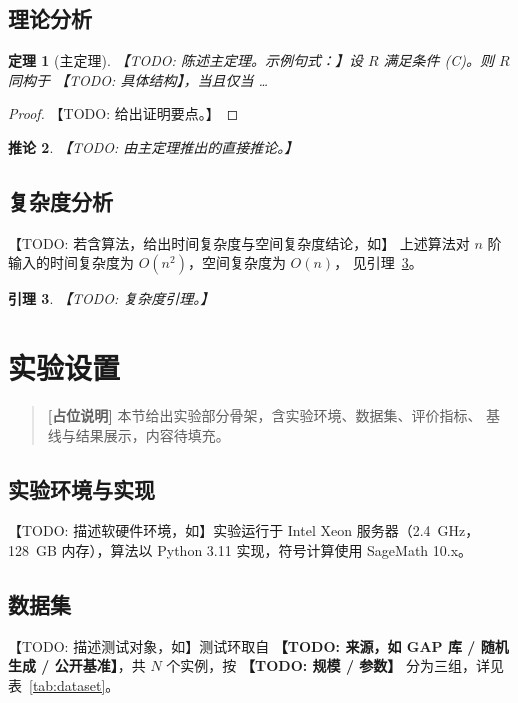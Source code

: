 \documentclass[11pt]{ctexart}
\theoremstyle{plain}
\newtheorem{theorem}{定理}[section]
\newtheorem{lemma}[theorem]{引理}
\newtheorem{corollary}[theorem]{推论}
\theoremstyle{definition}
\theoremstyle{remark}
\begin{document}
\subsection{理论分析}
\label{sec:method-analysis}
\begin{theorem}[主定理]
\label{thm:main}
【TODO: 陈述主定理。示例句式：】设 $R$ 满足条件 (C)。则 $R$ 同构于
【TODO: 具体结构】，当且仅当 \dots
\end{theorem}

\begin{proof}
【TODO: 给出证明要点。】
\end{proof}

\begin{corollary}
\label{cor:main}
【TODO: 由主定理推出的直接推论。】
\end{corollary}

\subsection{复杂度分析}
\label{sec:method-complexity}
【TODO: 若含算法，给出时间复杂度与空间复杂度结论，如】
上述算法对 $n$ 阶输入的时间复杂度为 $O(n^2)$，空间复杂度为 $O(n)$，
见引理~\ref{lem:complexity}。

\begin{lemma}
\label{lem:complexity}
【TODO: 复杂度引理。】
\end{lemma}

\section{实验设置}
\label{sec:experiment}
\begin{quote}
\textbf{[占位说明]} 本节给出实验部分骨架，含实验环境、数据集、评价指标、
基线与结果展示，内容待填充。
\end{quote}

\subsection{实验环境与实现}
\label{sec:exp-env}
【TODO: 描述软硬件环境，如】实验运行于 Intel Xeon 服务器（2.4~GHz，
128~GB 内存），算法以 Python 3.11 实现，符号计算使用 SageMath 10.x。

\subsection{数据集}
\label{sec:exp-data}
【TODO: 描述测试对象，如】测试环取自 \textbf{【TODO: 来源，如 GAP 库 /
随机生成 / 公开基准】}，共 $N$ 个实例，按 \textbf{【TODO: 规模 / 参数】}
分为三组，详见表~\ref{tab:dataset}。
\end{document}
